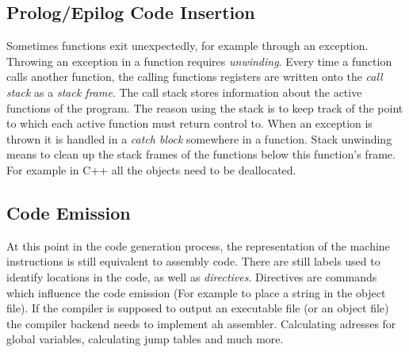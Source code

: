 \subsection{Prolog/Epilog Code Insertion}

Sometimes functions exit unexpectedly, for example through an exception.
Throwing an exception in a function requires \textit{unwinding}.
Every time a function calls another function, the calling functions registers are written onto the \textit{call stack}
as a \textit{stack frame}. The call stack stores information about the active functions of the program. 
The reason using the stack is to keep track of the point to which each active function must return control to.
When an exception is thrown it is handled in a \textit{catch block} somewhere in a function.
Stack unwinding means to clean up the stack frames of the functions below this function's frame.
For example in C++ all the objects need to be deallocated.

\subsection{Code Emission}

At this point in the code generation process, the representation of the machine instructions is still
equivalent to assembly code. There are still labels used to identify locations in the code, as well
as \textit{directives}. Directives are commands which influence the code emission (For example to place
a string in the object file).
If the compiler is supposed to output an executable file (or an object file) the compiler backend 
needs to implement ah assembler. Calculating adresses for global variables, calculating jump tables and much
more.